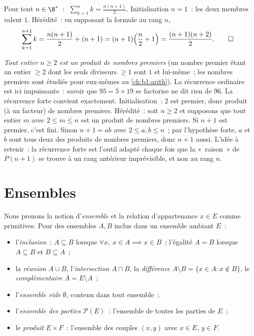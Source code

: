 \begin{example}\label{ex:b1:logic:induction}
Pour tout $n \in \N^*$~: $\;\sum_{k=1}^n k = \frac{n(n+1)}{2}$.
Initialisation $n = 1$~: les deux membres valent $1$. Hérédité~: en
supposant la formule au rang $n$,
\[
\sum_{k=1}^{n+1} k = \frac{n(n+1)}{2} + (n+1)
= (n+1)\Bigl(\frac n2 + 1\Bigr) = \frac{(n+1)(n+2)}{2}. \qedhere
\]
\end{example}

\begin{example}\label{ex:b1:logic:strongind}
\emph{Tout entier $n \geq 2$ est un produit de nombres premiers} (un
nombre premier étant un entier $\geq 2$ dont les seuls diviseurs
$\geq 1$ sont $1$ et lui-même~; les nombres premiers sont étudiés pour
eux-mêmes au \cref{ch:b1:arith}). La récurrence ordinaire est ici
impuissante~: savoir que $95 = 5 \times 19$ se factorise ne dit rien de
$96$. La récurrence forte convient exactement. Initialisation~: $2$ est
premier, donc produit (à un facteur) de nombres premiers. Hérédité~:
soit $n \geq 2$ et supposons que tout entier $m$ avec $2 \leq m \leq n$
est un produit de nombres premiers. Si $n + 1$ est premier, c'est fini.
Sinon $n + 1 = ab$ avec $2 \leq a, b \leq n$~; par l'hypothèse forte,
$a$ et $b$ sont tous deux des produits de nombres premiers, donc $n + 1$
aussi. L'idée à retenir~: la récurrence forte est l'outil adapté chaque
fois que la «~raison~» de $P(n+1)$ se trouve à un rang antérieur
imprévisible, et non au rang $n$.
\end{example}

\section{Ensembles}

\begin{definition}\label{def:b1:logic:sets}
Nous prenons la notion d'\emph{ensemble} et la relation
d'appartenance $x \in E$ comme primitives. Pour des ensembles $A, B$
inclus dans un ensemble ambiant $E$~:
\begin{itemize}
  \item l'\emph{inclusion}~: $A \subseteq B$ lorsque $\forall x,\ x \in
        A \implies x \in B$~; l'égalité $A = B$ lorsque $A \subseteq B$
        et $B \subseteq A$~;
  \item la \emph{réunion} $A \cup B$, l'\emph{intersection} $A \cap B$,
        la \emph{différence} $A \setminus B = \{x \in A : x \notin B\}$,
        le \emph{complémentaire} $\overline{A} = E \setminus A$~;
  \item l'\emph{ensemble vide} $\emptyset$, contenu dans tout ensemble~;
  \item l'\emph{ensemble des parties}
        $\mathcal{P}(E)$~: l'ensemble de toutes les parties de $E$~;
  \item le \emph{produit} $E \times F$~: l'ensemble des couples
        $(x, y)$ avec $x \in E$, $y \in F$.
\end{itemize}
\end{definition}

